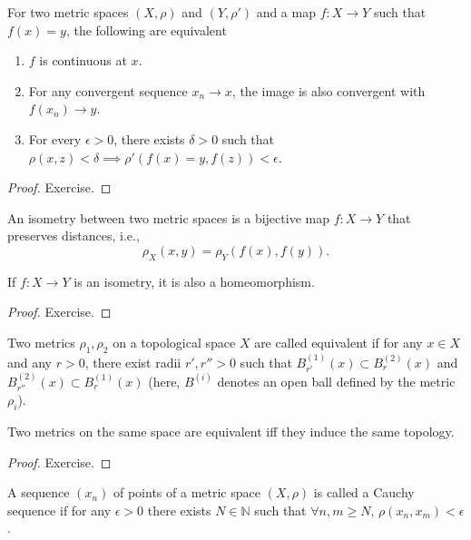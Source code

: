 \documentclass[english,letterpaper]{article}%
\numberwithin{equation}{section}
\numberwithin{figure}{section}
\numberwithin{table}{section}
\theoremstyle{definition}
\theoremstyle{definition}
\theoremstyle{definition}
\theoremstyle{plain}
\theoremstyle{plain}
\theoremstyle{plain}
\theoremstyle{plain}
\theoremstyle{remark}
\theoremstyle{remark}
\renewcommand{\geq}{\geqslant}
\begin{document}
\begin{prop}
For two metric spaces $(X,\rho)$ and $(Y,\rho')$ and a map $f:X\rightarrow Y$ such that $f(x)=y$, the following are equivalent
\begin{enumerate}
    \item $f$ is continuous at $x$.
    \item For any convergent sequence $x_n\rightarrow x$, the image is also convergent with $f(x_n)\rightarrow y$.
    \item For every $\epsilon>0$, there exists $\delta>0$ such that $\rho(x,z)<\delta \implies \rho'(f(x)=y, f(z))<\epsilon$.
\end{enumerate}
\end{prop}
\begin{proof}
Exercise.
\end{proof}

\begin{defn}[Isometry]
An isometry between two metric spaces is a bijective map $f:X\rightarrow Y$ that preserves distances, i.e.,
\begin{equation}
    \rho_X(x,y) = \rho_Y(f(x), f(y)).
\end{equation}
\end{defn}

\begin{prop}
If $f:X\rightarrow Y$ is an isometry, it is also a homeomorphism.
\end{prop}
\begin{proof}
Exercise.
\end{proof}

\begin{defn}
Two metrics $\rho_1,\rho_2$ on a topological space $X$ are called equivalent if for any $x\in X$ and any $r>0$, there exist radii $r',r''>0$ such that $B^{(1)}_{r'}(x)\subset B^{(2)}_{r}(x)$ and $B^{(2)}_{r''}(x)\subset B^{(1)}_{r}(x)$ (here, $B^{(i)}$ denotes an open ball defined by the metric $\rho_i$).
\end{defn}

\begin{thm}
Two metrics on the same space are equivalent iff they induce the same topology.
\end{thm}
\begin{proof}
Exercise.
\end{proof}

\begin{defn}
A sequence $(x_n)$ of points of a metric space $(X,\rho)$ is called a Cauchy sequence if for any $\epsilon>0$ there exists $N\in\mathbb{N}$ such that $\forall n,m\geq N$, $\rho(x_n,x_m)<\epsilon$.
\end{defn}
\end{document}
